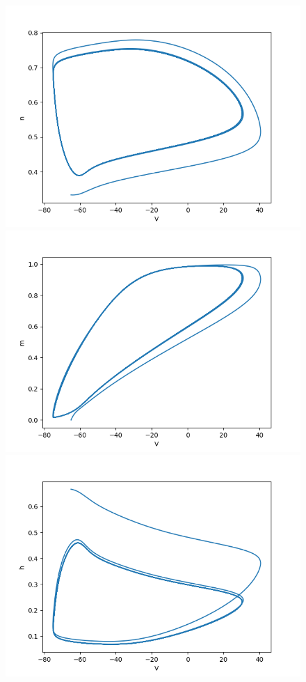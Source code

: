 \documentclass[12pt]{scrartcl}
\begin{document}
\begin{figure}[!h]
\begin{minipage}[l]{.3\linewidth}
\centering
\includegraphics[scale=0.35]{imgs/hh22.png}
\end{minipage}\hfill
\begin{minipage}[l]{.3\linewidth}
\centering
\includegraphics[scale=0.35]{imgs/hh23.png}
\end{minipage}\hfill
\begin{minipage}[l]{.3\linewidth}
\centering
\includegraphics[scale=0.35]{imgs/hh24.png}

\end{minipage}
\end{figure}
\end{document}
